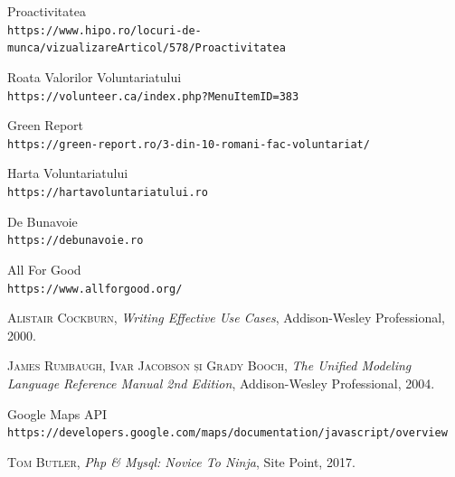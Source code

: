 \documentclass[12pt,a4paper]{report}
\begin{document}
\begin{thebibliography}{1}
Proactivitatea
\\\texttt{https://www.hipo.ro/locuri-de-munca/vizualizareArticol/578/Proactivitatea}

Roata Valorilor Voluntariatului
\\\texttt{https://volunteer.ca/index.php?MenuItemID=383}

Green Report
\\\texttt{https://green-report.ro/3-din-10-romani-fac-voluntariat/}

Harta Voluntariatului
\\\texttt{https://hartavoluntariatului.ro}

De Bunavoie
\\\texttt{https://debunavoie.ro}

All For Good
\\\texttt{https://www.allforgood.org/}

\textsc{Alistair Cockburn}, \emph{Writing Effective Use Cases}, Addison-Wesley Professional, 2000.

\textsc{James Rumbaugh, Ivar Jacobson și Grady Booch}, \emph{The Unified Modeling Language Reference Manual 2nd Edition}, Addison-Wesley Professional, 2004.

Google Maps API
\\\texttt{https://developers.google.com/maps/documentation/javascript/overview}

\textsc{Tom Butler}, \emph{Php \& Mysql: Novice To Ninja}, Site Point, 2017.

\end{thebibliography}
\end{document}
